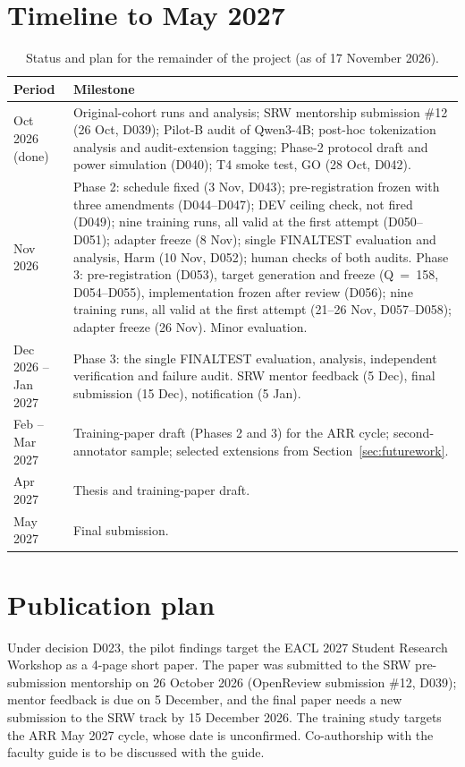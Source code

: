 \documentclass[12pt,a4paper,oneside]{report}
\renewcommand{\_}{\oldunderscore\allowbreak}
\begin{document}
\section{Timeline to May 2027}

\begin{table}[H]
\centering\small
\caption{Status and plan for the remainder of the project (as of 17 November 2026).}
\label{tab:timeline}
\begin{tabularx}{\linewidth}{@{}lL@{}}
\toprule
Period & Milestone\\
\midrule
Oct 2026 (done) & Original-cohort runs and analysis; SRW mentorship submission \#12 (26 Oct, D039); Pilot-B audit of Qwen3-4B; post-hoc tokenization analysis and audit-extension tagging; Phase-2 protocol draft and power simulation (D040); T4 smoke test, GO (28 Oct, D042).\\
Nov 2026 & Phase 2: schedule fixed (3 Nov, D043); pre-registration frozen with three amendments (D044--D047); DEV ceiling check, not fired (D049); nine training runs, all valid at the first attempt (D050--D051); adapter freeze (8 Nov); single FINAL\_TEST evaluation and analysis, Harm (10 Nov, D052); human checks of both audits. Phase 3: pre-registration (D053), target generation and freeze (Q~=~158, D054--D055), implementation frozen after review (D056); nine training runs, all valid at the first attempt (21--26 Nov, D057--D058); adapter freeze (26 Nov). Minor evaluation.\\
Dec 2026 -- Jan 2027 & Phase 3: the single FINAL\_TEST evaluation, analysis, independent verification and failure audit. SRW mentor feedback (5 Dec), final submission (15 Dec), notification (5 Jan).\\
Feb -- Mar 2027 & Training-paper draft (Phases 2 and 3) for the ARR cycle; second-annotator sample; selected extensions from Section~\ref{sec:futurework}.\\
Apr 2027 & Thesis and training-paper draft.\\
May 2027 & Final submission.\\
\bottomrule
\end{tabularx}
\end{table}

\section{Publication plan}

Under decision D023, the pilot findings target the EACL 2027 Student Research Workshop as a 4-page short paper. The paper was submitted to the SRW pre-submission mentorship on 26 October 2026 (OpenReview submission \#12, D039); mentor feedback is due on 5 December, and the final paper needs a new submission to the SRW track by 15 December 2026. The training study targets the ARR May 2027 cycle, whose date is unconfirmed. Co-authorship with the faculty guide is to be discussed with the guide.
\end{document}
